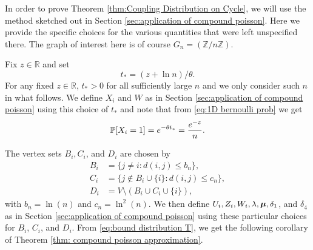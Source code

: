 	In order to prove Theorem \ref{thm:Coupling Distribution on Cycle}, we will use the method sketched out in Section \ref{sec:application of compound poisson}. Here we provide the specific choices for the various quantities that were left unspecified there. The graph of interest here is of course $G_n = (\mathbb{Z} / n \mathbb{Z})$.

	Fix $z \in \mathbb{R}$ and set 
	\begin{equation}
		t_* = (z + \ln n)/\theta.
	\end{equation}
	For any fixed $z \in \mathbb{R}$, $t_* > 0$ for all sufficiently large $n$ and we only consider such $n$ in what follows. We define $X_i$ and $W$ as in Section \ref{sec:application of compound poisson} using this choice of $t_*$ and note that from \eqref{eq:1D bernoulli prob} we get
	\begin{equation}
		\label{eq:1D prob X_i}
		\mathbb{P}[X_i = 1] = e^{-\theta t_*} = \frac{e^{-z}}{n}.
	\end{equation}

	The vertex sets $B_i, C_i$, and $D_i$ are chosen by
	\begin{align}
		B_i &= \{j\neq i : d(i,j) \leq b_n \},\\
		C_i &= \{j\notin B_i\cup \{i\}: d(i,j) \leq c_n\},\\
		D_i &= V \setminus (B_i \cup C_i \cup \{i\}),
	\end{align}
	with $b_n = \ln(n)$ and $c_n = \ln^2(n)$. We then define $U_i, Z_i, W_i, \lambda, {\bm{{\mu}}}, \delta_1$, and $\delta_4$ as in Section \ref{sec:application of compound poisson} using these particular choices for $B_i$, $C_i$, and $D_i$. From \eqref{eq:bound distribution T}, we get the following corollary of Theorem \ref{thm: compound poisson approximation}.



